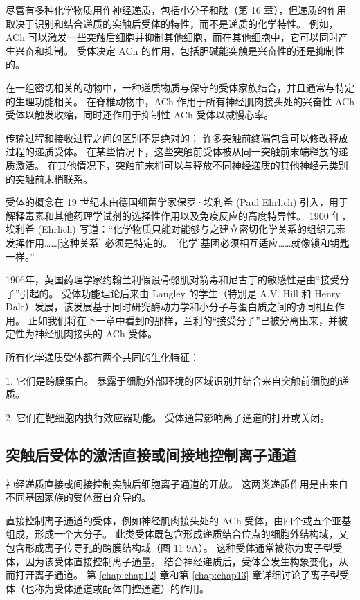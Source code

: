 尽管有多种化学物质用作神经递质，包括小分子和肽（第 16 章），但递质的作用取决于识别和结合递质的突触后受体的特性，而不是递质的化学特性。 
例如，ACh 可以激发一些突触后细胞并抑制其他细胞，而在其他细胞中，它可以同时产生兴奋和抑制。 
受体决定 ACh 的作用，包括胆碱能突触是兴奋性的还是抑制性的。


在一组密切相关的动物中，一种递质物质与保守的受体家族结合，并且通常与特定的生理功能相关。 
在脊椎动物中，ACh 作用于所有神经肌肉接头处的兴奋性 ACh 受体以触发收缩，同时还作用于抑制性 ACh 受体以减慢心率。


传输过程和接收过程之间的区别不是绝对的； 许多突触前终端包含可以修改释放过程的递质受体。 
在某些情况下，这些突触前受体被从同一突触前末端释放的递质激活。 
在其他情况下，突触前末梢可以与释放不同神经递质的其他神经元类别的突触前末梢联系。


受体的概念在 19 世纪末由德国细菌学家保罗·埃利希 (Paul Ehrlich) 引入，用于解释毒素和其他药理学试剂的选择性作用以及免疫反应的高度特异性。 
1900 年，埃利希 (Ehrlich) 写道：“化学物质只能对能够与之建立密切化学关系的组织元素发挥作用……[这种关系] 必须是特定的。 
[化学]基团必须相互适应……就像锁和钥匙一样。”


1906年，英国药理学家约翰兰利假设骨骼肌对箭毒和尼古丁的敏感性是由“接受分子”引起的。 
受体功能理论后来由 Langley 的学生（特别是 A.V. Hill 和 Henry Dale）发展，该发展基于同时研究酶动力学和小分子与蛋白质之间的协同相互作用。 
正如我们将在下一章中看到的那样，兰利的“接受分子”已被分离出来，并被定性为神经肌肉接头的 ACh 受体。


所有化学递质受体都有两个共同的生化特征：

1. 它们是跨膜蛋白。 
暴露于细胞外部环境的区域识别并结合来自突触前细胞的递质。 


2. 它们在靶细胞内执行效应器功能。 
受体通常影响离子通道的打开或关闭。


\subsection{突触后受体的激活直接或间接地控制离子通道}

神经递质直接或间接控制突触后细胞离子通道的开放。 
这两类递质作用是由来自不同基因家族的受体蛋白介导的。


直接控制离子通道的受体，例如神经肌肉接头处的 ACh 受体，由四个或五个亚基组成，形成一个大分子。 
此类受体既包含形成递质结合位点的细胞外结构域，又包含形成离子传导孔的跨膜结构域（图 11-9A）。 
这种受体通常被称为离子型受体，因为该受体直接控制离子通量。 
结合神经递质后，受体会发生构象变化，从而打开离子通道。 第 \ref{chap:chap12} 章和第 \ref{chap:chap13} 章详细讨论了离子型受体（也称为受体通道或配体门控通道）的作用。


